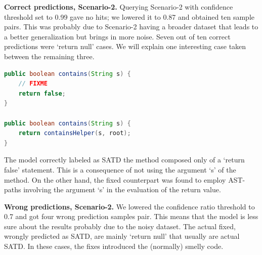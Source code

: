 \textbf{Correct predictions, Scenario-2.}
 Querying Scenario-2 with confidence threshold set to 0.99 gave no hits; we lowered it to 0.87 and obtained ten sample pairs. This was probably due to Scenario-2 having a broader dataset that leads to a better generalization but brings in more noise. 
 Seven out of ten correct predictions were `return null' cases. We will explain one interesting case taken between the remaining three.


\begin{lstlisting}[caption={Scenario-2 correct predictions, verbatim source code}, label={lst:scenario_2_correct},language=Java]
public boolean contains(String s) {
    // FIXME
    return false;
}

public boolean contains(String s) {
    return containsHelper(s, root);
}
\end{lstlisting}

The model correctly labeled as SATD the method composed only of a `return false' statement. This is a consequence of not using the argument `s' of the method. On the other hand, the fixed counterpart was found to employ AST-paths involving the argument `s' in the evaluation of the return value.

\textbf{Wrong predictions, Scenario-2.}
We lowered the confidence ratio threshold to 0.7 and got four wrong prediction samples pair. This means that the model is less sure about the results probably due to the noisy dataset.
The actual fixed, wrongly predicted as SATD, are mainly `return null' that usually are actual SATD. In these cases, the fixes introduced the (normally) smelly code.